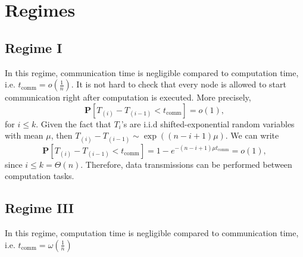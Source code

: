 \documentclass[onecolumn,journal,twoside]{IEEEtran}
\begin{document}
\iffalse
\section{Regimes}
\subsection{Regime I}
In this regime, communication time is negligible compared to computation time, i.e. $t_{\text{comm}}=o(\frac{1}{n})$. It is not hard to check that every node is allowed to start communication right after computation is executed. More precisely, 
\begin{equation}
\mathbf{P}[T_{(i)}-T_{(i-1)}<t_{\text{comm}}]=o(1),
\end{equation}
for $i\leq k$. Given the fact that $T_i$'s are i.i.d shifted-exponential random variables with mean $\mu$, then $T_{(i)}-T_{(i-1)}\sim \exp((n-i+1)\mu)$. We can write 
\begin{equation}
\mathbf{P}[T_{(i)}-T_{(i-1)}<t_{\text{comm}}] =1-e^{-(n-i+1)\mu t_{\text{comm}}}=o(1),
\end{equation}
since $i\leq k = \Theta(n)$. Therefore, data transmissions can be performed between computation tasks. 
\subsection{Regime III}
In this regime, computation time is negligible compared to communication time, i.e. $t_{\text{comm}}=\omega(\frac{1}{n})$
\end{document}
